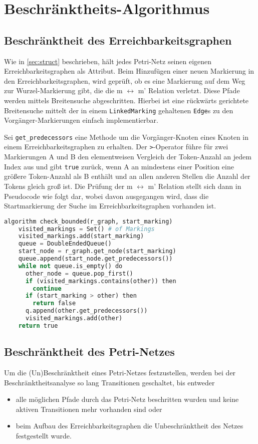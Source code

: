 \section{Beschränktheits-Algorithmus}
\label{sec:algo}

\subsection{Beschränktheit des Erreichbarkeitsgraphen}
Wie in \cref{sec:struct} beschrieben, hält jedes Petri-Netz seinen eigenen
Erreichbarkeitsgraphen als Attribut. Beim Hinzufügen einer neuen Markierung in
den Erreichbarkeitsgraphen, wird geprüft, ob es eine Markierung auf dem Weg zur
Wurzel-Markierung gibt, die die m $\leftrightarrow$ m' Relation verletzt. Diese
Pfade werden mittels Breitensuche abgeschritten. Hierbei ist eine rückwärts
gerichtete Breitensuche mittelt der in einem \texttt{LinkedMarking} gehaltenen
\texttt{Edge}s zu den Vorgänger-Markierungen einfach implementierbar.

Sei \texttt{get\_predecessors} eine Methode um die Vorgänger-Knoten eines Knoten
in einem Erreichbarkeitsgraphen zu erhalten. Der \texttt{\textgreater}-Operator
führe für zwei Markierungen A und B den elementweisen Vergleich der Token-Anzahl
an jedem Index aus und gibt \texttt{true} zurück, wenn A an mindestens einer
Position eine größere Token-Anzahl als B enthält und an allen anderen Stellen
die Anzahl der Tokens gleich groß ist. %
Die Prüfung der m $\leftrightarrow$ m' Relation stellt
sich dann in Pseudocode wie folgt dar, wobei davon ausgegangen wird, dass die
Startmarkierung der Suche im Erreichbarkeitsgraphen vorhanden ist.

\begin{lstlisting}[language=python, morekeywords={do, algorithm, then}]
  algorithm check_bounded(r_graph, start_marking)
    visited_markings = Set() # of Markings
    visited_markings.add(start_marking)
    queue = DoubleEndedQueue()
    start_node = r_graph.get_node(start_marking)
    queue.append(start_node.get_predecessors())
    while not queue.is_empty() do
      other_node = queue.pop_first()
      if (visited_markings.contains(other)) then
        continue
      if (start_marking > other) then
        return false
      q.append(other.get_predecessors())
      visited_markings.add(other)
    return true
\end{lstlisting}

\subsection{Beschränktheit des Petri-Netzes}
Um die (Un)Beschränktheit eines Petri-Netzes festzustellen, werden bei der
Beschränktheitsanalyse so lang Transitionen geschaltet, bis entweder
\begin{itemize}
  \item alle möglichen Pfade durch das Petri-Netz beschritten wurden und keine
        aktiven Transitionen mehr vorhanden sind oder
  \item beim Aufbau des Erreichbarkeitsgraphen die Unbeschränktheit des Netzes
        festgestellt wurde.
\end{itemize}


